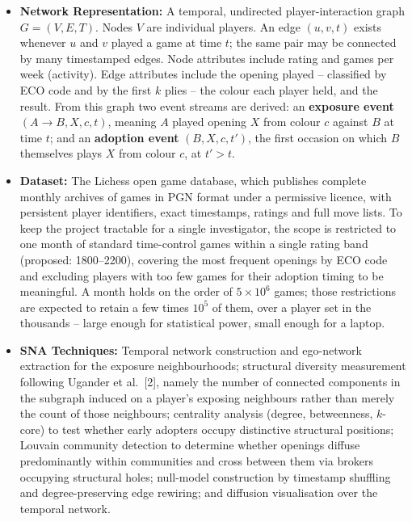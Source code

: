 \documentclass[11pt,a4paper]{article}
\begin{document}
\begin{itemize}
    \item \textbf{Network Representation:}
    A temporal, undirected player-interaction graph $G = (V, E, T)$. Nodes $V$
    are individual players. An edge $(u, v, t)$ exists whenever $u$ and $v$
    played a game at time $t$; the same pair may be connected by many timestamped
    edges. Node attributes include rating and games per week (activity). Edge
    attributes include the opening played -- classified by ECO
    code and by the first $k$ plies -- the colour each player held, and the
    result. From this graph two event streams are derived: an
    \textbf{exposure event} $(A \rightarrow B, X, c, t)$, meaning $A$ played
    opening $X$ from colour $c$ against $B$ at time $t$; and an
    \textbf{adoption event} $(B, X, c, t')$, the first occasion on which $B$
    themselves plays $X$ from colour $c$, at $t' > t$.

    \item \textbf{Dataset:}
    The Lichess open game database, which publishes complete monthly archives of
    games in PGN format under a permissive licence, with persistent player
    identifiers, exact timestamps, ratings and full move lists. To keep the
    project tractable for a single investigator, the scope is restricted to one
    month of standard time-control games within a single rating band (proposed:
    1800--2200), covering the most frequent openings by ECO code and excluding
    players with too few games for their adoption timing to be meaningful. A
    month holds on the order of $5 \times 10^6$ games; those restrictions are
    expected to retain a few times $10^5$ of them, over a player set in the
    thousands -- large enough for statistical power, small enough for a laptop.

    \item \textbf{SNA Techniques:}
    Temporal network construction and ego-network extraction for the exposure
    neighbourhoods; structural diversity measurement following Ugander et
    al.~[2], namely the number of connected components in the subgraph induced
    on a player's exposing neighbours rather than merely the count of those
    neighbours; centrality analysis (degree, betweenness, $k$-core) to test
    whether early adopters occupy distinctive structural positions; Louvain
    community detection to determine whether openings diffuse
    predominantly within communities and cross between them via brokers
    occupying structural holes; null-model construction by timestamp shuffling
    and degree-preserving edge rewiring; and diffusion visualisation over the
    temporal network.


\end{itemize}
\end{document}
